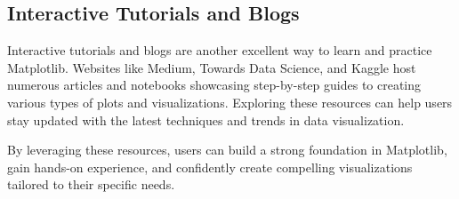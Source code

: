 \subsection{Interactive Tutorials and Blogs}
Interactive tutorials and blogs are another excellent way to learn and practice Matplotlib. Websites like Medium, Towards Data Science, and Kaggle host numerous articles and notebooks showcasing step-by-step guides to creating various types of plots and visualizations. Exploring these resources can help users stay updated with the latest techniques and trends in data visualization.

By leveraging these resources, users can build a strong foundation in Matplotlib, gain hands-on experience, and confidently create compelling visualizations tailored to their specific needs.


